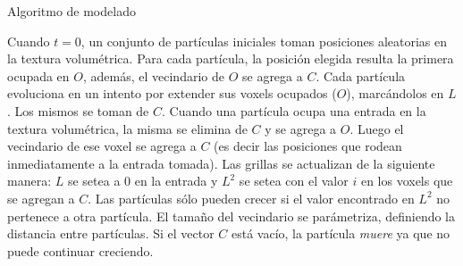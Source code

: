 \begin{algorithm}[h!]
\caption{Algoritmo de modelado}
\begin{algorithmic}


    \EndFor
\EndFor

        \EndIf
                 
                 
            \EndIf
        \EndFor
    \EndFor
\EndFor
\end{algorithmic}
\end{algorithm}

Cuando $t = 0$, un conjunto de part\'iculas iniciales toman posiciones aleatorias en la textura volumétrica.
Para cada partícula, la posici\'on elegida resulta la primera ocupada en $O$, adem\'as, el vecindario de $O$ se agrega a $C$.
Cada part\'icula evoluciona en un intento por extender sus voxels ocupados ($O$), marcándolos en $L$. Los mismos se toman de $C$.
Cuando una part\'icula ocupa una entrada en la textura volumétrica, la misma se elimina de $C$ y se agrega a $O$.
Luego el vecindario de ese voxel se agrega a $C$ (es decir las posiciones que rodean inmediatamente a la entrada tomada).
Las grillas se actualizan de la siguiente manera: $L$ se setea a $0$ en la entrada y $L^{2}$ se setea con el valor $i$ en los voxels que se agregan a $C$. Las part\'iculas s\'olo pueden crecer si el valor encontrado en $L^{2}$ no pertenece a otra part\'icula.
El tama\~no del vecindario se par\'ametriza, definiendo la distancia entre part\'iculas.
Si el vector $C$ est\'a vac\'io, la part\'icula {\em muere} ya que no puede continuar creciendo.


